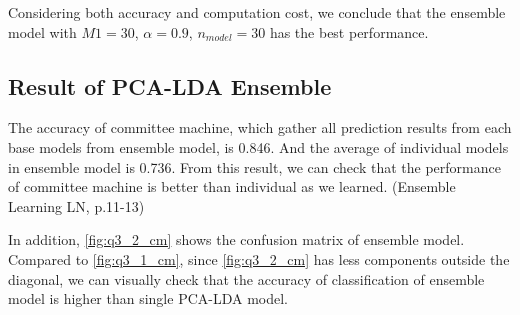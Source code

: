 Considering both accuracy and computation cost, we conclude that the ensemble model with $M1=30$, $\alpha=0.9$, $n_{model}=30$ has the best performance.


\subsection{Result of PCA-LDA Ensemble}
The accuracy of committee machine, which gather all prediction results from each base models from ensemble model, is 0.846. And the average of individual models in ensemble model is 0.736. From this result, we can check that the performance of committee machine is better than individual as we learned. (Ensemble Learning LN, p.11-13)

In addition, \cref{fig:q3_2_cm} shows the confusion matrix of ensemble model. Compared to \cref{fig:q3_1_cm}, since \cref{fig:q3_2_cm} has less components outside the diagonal, we can visually check that the accuracy of classification of ensemble model is higher than single PCA-LDA model.
